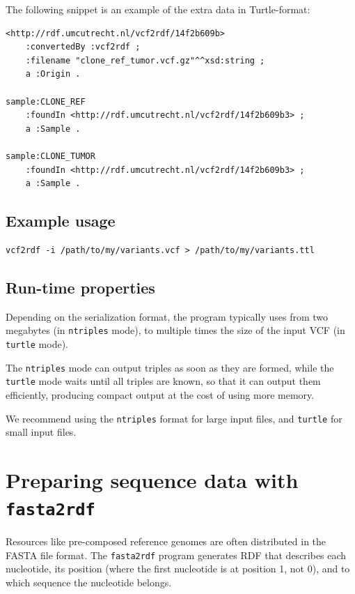 \documentclass[11pt,a4paper,oneside]{book}
\begin{document}
  The following snippet is an example of the extra data in Turtle-format:

  \begin{siderules}
\begin{verbatim}
<http://rdf.umcutrecht.nl/vcf2rdf/14f2b609b>
    :convertedBy :vcf2rdf ;
    :filename "clone_ref_tumor.vcf.gz"^^xsd:string ;
    a :Origin .

sample:CLONE_REF
    :foundIn <http://rdf.umcutrecht.nl/vcf2rdf/14f2b609b3> ;
    a :Sample .

sample:CLONE_TUMOR
    :foundIn <http://rdf.umcutrecht.nl/vcf2rdf/14f2b609b3> ;
    a :Sample .
\end{verbatim}
\end{siderules}

\subsection{Example usage}

\begin{siderules}
\begin{verbatim}
vcf2rdf -i /path/to/my/variants.vcf > /path/to/my/variants.ttl
\end{verbatim}
\end{siderules}

\subsection{Run-time properties}

  Depending on the serialization format, the program typically uses from two megabytes
  (in \texttt{ntriples} mode), to multiple times the size of the input VCF
  (in \texttt{turtle} mode).

  The \texttt{ntriples} mode can output triples as soon as they are formed, while the
  \texttt{turtle} mode waits until all triples are known, so that it can output them
  efficiently, producing compact output at the cost of using more memory.

  We recommend using the \texttt{ntriples} format for large input files, and
  \texttt{turtle} for small input files.

\section{Preparing sequence data with \texttt{fasta2rdf}}
\label{sec:fasta2rdf}

  Resources like pre-composed reference genomes are often distributed in the
  FASTA file format.  The \texttt{fasta2rdf} program generates RDF that
  describes each nucleotide, its position (where the first nucleotide is at
  position 1, not 0), and to which sequence the nucleotide belongs.
\end{document}
